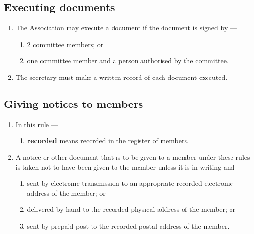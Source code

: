 \documentclass[../constitution.tex]{subfiles}
\begin{document}
\hypertarget{executing-documents}{%
\subsection{Executing documents}\label{executing-documents}}

\begin{enumerate}

\item The Association may execute a document if the document is signed by ---

  \begin{enumerate}
  
  \item 2 committee members; or
  \item one committee member and a person authorised by the committee.
  \end{enumerate}
\item The secretary must make a written record of each document executed.
\end{enumerate}

\hypertarget{giving-notices-to-members}{%
\subsection{Giving notices to members}\label{giving-notices-to-members}}

\begin{enumerate}

\item In this rule ---

  \begin{enumerate}
  
  \item \textbf{recorded} means recorded in the register of members.
  \end{enumerate}
\item A notice or other document that is to be given to a member under these rules is taken not to have been given to the member unless it is in writing and ---

  \begin{enumerate}
  
  \item sent by electronic transmission to an appropriate recorded electronic address of the member; or
  \item delivered by hand to the recorded physical address of the member; or
  \item sent by prepaid post to the recorded postal address of the member.
  \end{enumerate}
\end{enumerate}
\end{document}
